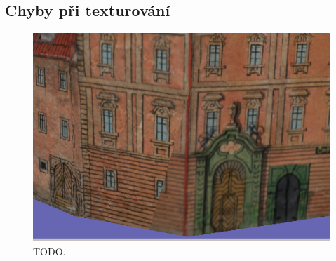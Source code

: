 \documentclass[11pt,twoside,a4paper]{book}
\begin{document}
\subsection{Chyby při texturování}

\begin{figure}[h]
\begin{center}
\includegraphics[width=\textwidth]{figures/err-1}
\caption{TODO.}
\label{fig:err-1}
\end{center}
\end{figure}
\end{document}
